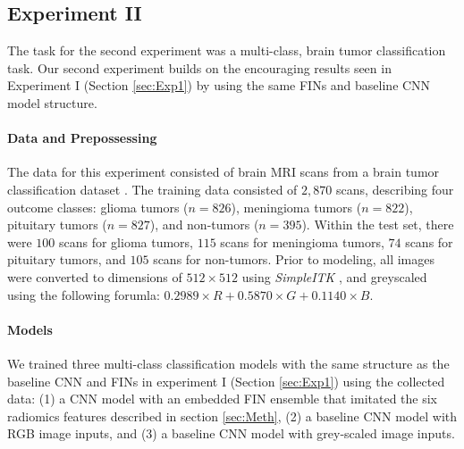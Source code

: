 \documentclass{article}
\begin{document}
\subsection{Experiment II}\label{sec:Exp2}
The task for the second experiment was a multi-class, brain tumor classification task. Our second experiment builds on the encouraging results seen in Experiment I (Section \ref{sec:Exp1}) by using the same FINs and baseline CNN model structure.


\paragraph*{Data and Prepossessing} The data for this experiment consisted of brain MRI scans from a brain tumor classification dataset \cite{brainMulti}. The training data consisted of $2,870$ scans, describing four outcome classes: glioma tumors ($n=826$), meningioma tumors ($n=822$), pituitary tumors ($n=827$), and non-tumors ($n=395$). Within the test set, there were $100$ scans for glioma tumors, $115$ scans for meningioma tumors, $74$ scans for pituitary tumors, and $105$ scans for non-tumors. Prior to modeling, all images were converted to dimensions of $512 \times 512$ using \textit{SimpleITK} \cite{yaniv2018simpleitk}, and greyscaled using the following forumla: \textit{$0.2989 \times R + 0.5870 \times G + 0.1140 \times B$}.

 



\paragraph*{Models} We trained three multi-class classification models with the same structure as the baseline CNN and FINs in experiment I (Section \ref{sec:Exp1}) using the collected data: (1) a CNN model with an embedded FIN ensemble that imitated the six radiomics features described in section \ref{sec:Meth}, (2) a baseline CNN model with RGB image inputs, and (3) a baseline CNN model with grey-scaled image inputs. 
\end{document}
